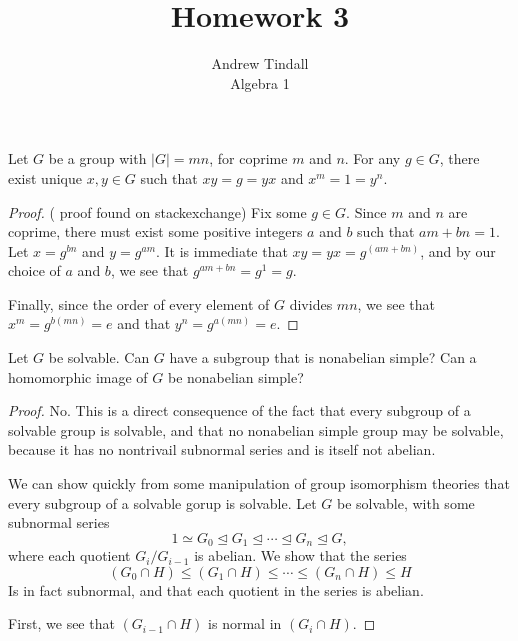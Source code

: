\documentclass[12pt]{article}
\theoremstyle{definition}
\newenvironment{problem}[2][Problem]{\begin{trivlist}
\item[\hskip \labelsep {\bfseries #1}\hskip \labelsep {\bfseries #2.}]}{\end{trivlist}}
\begin{document}
 
 
\title{Homework 3}
\author{Andrew Tindall\\
Algebra 1}
 
\maketitle
\begin{problem}{1}
    Let $G$ be a group with $\left \lvert { G } \right \lvert = mn$, for coprime $m$ and $n$. For any $g\in G$, there exist unique $x, y \in G$ such that $xy = g = yx$ and $x^m = 1 = y^n$.
    \begin{proof}
        ( proof found on stackexchange) Fix some $g \in G$. Since $m$ and $n$ are coprime, there must exist some positive integers $a$ and $b$ such that $am + bn = 1$. Let $x = g^{bn}$ and $y = g^{am}$. It is immediate that $xy = yx = g^{(am + bn)}$, and by our choice of $a$ and $b$, we see that $g^{am + bn} = g^1 = g$.
        \par Finally, since the order of every element of $G$ divides $mn$, we see that $x^m = g^{b(mn)} = e$ and that $y^n = g^{a(mn)} = e$.
    \end{proof}
\end{problem}
\begin{problem}{2}Let $G$ be solvable. Can $G$ have a subgroup that is nonabelian simple? Can a homomorphic image of $G$ be nonabelian simple?
    \begin{proof}
        No. This is a direct consequence of the fact that every subgroup of a solvable group is solvable, and that no nonabelian simple group may be solvable, because it has no nontrivail subnormal series and is itself not abelian.
        \par We can show quickly from some manipulation of group isomorphism theories that every subgroup of a solvable gorup is solvable. Let $G$ be solvable, with some subnormal series 
        \[
           1 \simeq G_0 \trianglelefteq G_1 \trianglelefteq \cdots \trianglelefteq G_n \trianglelefteq G,        
        \]
        where each quotient $G_i / G_{i-1}$ is abelian. We show that the series
        \[
         (G_0 \cap H) \leq (G_1 \cap H) \leq \cdots \leq (G_n \cap H) \leq H
        \]
        Is in fact subnormal, and that each quotient in the series is abelian.
        \par First, we see that $(G_{i -1} \cap H)$ is normal in $(G_i \cap H)$.
    \end{proof}
\end{problem}
\end{document}

